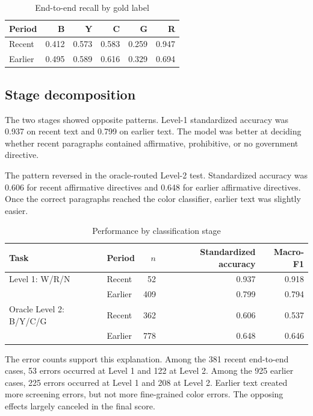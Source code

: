 \documentclass[11pt]{article}
\begin{document}
\begin{table}[ht]
\centering
\caption{End-to-end recall by gold label}
\label{tab:perlabel}
\begin{tabular}{lrrrrr}
\toprule
Period & B & Y & C & G & R \\
\midrule
Recent & 0.412 & 0.573 & 0.583 & 0.259 & 0.947 \\
Earlier & 0.495 & 0.589 & 0.616 & 0.329 & 0.694 \\
\bottomrule
\end{tabular}
\end{table}

\subsection{Stage decomposition}

The two stages showed opposite patterns. Level-1 standardized accuracy was 0.937 on recent text and 0.799 on earlier text. The model was better at deciding whether recent paragraphs contained affirmative, prohibitive, or no government directive.

The pattern reversed in the oracle-routed Level-2 test. Standardized accuracy was 0.606 for recent affirmative directives and 0.648 for earlier affirmative directives. Once the correct paragraphs reached the color classifier, earlier text was slightly easier.

\begin{table}[ht]
\centering
\caption{Performance by classification stage}
\label{tab:stages}
\begin{tabular}{llrrr}
\toprule
Task & Period & $n$ & Standardized accuracy & Macro-F1 \\
\midrule
Level 1: W/R/N & Recent & 52 & 0.937 & 0.918 \\
 & Earlier & 409 & 0.799 & 0.794 \\
\addlinespace
Oracle Level 2: B/Y/C/G & Recent & 362 & 0.606 & 0.537 \\
 & Earlier & 778 & 0.648 & 0.646 \\
\bottomrule
\end{tabular}
\end{table}

The error counts support this explanation. Among the 381 recent end-to-end cases, 53 errors occurred at Level 1 and 122 at Level 2. Among the 925 earlier cases, 225 errors occurred at Level 1 and 208 at Level 2. Earlier text created more screening errors, but not more fine-grained color errors. The opposing effects largely canceled in the final score.
\end{document}
